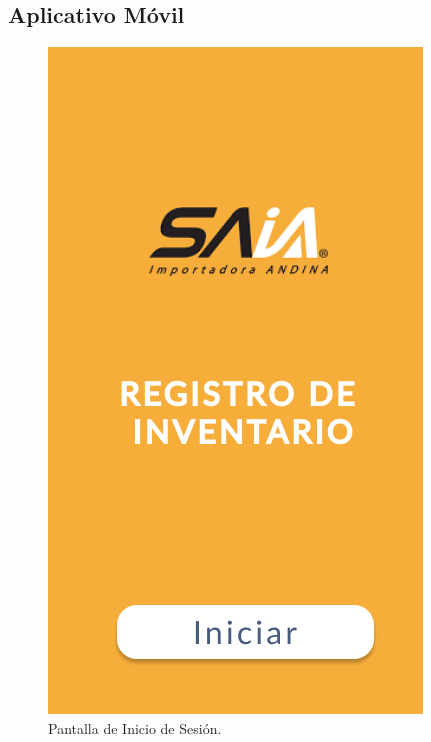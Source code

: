 \documentclass{scrreprt}
\begin{document}
    
    \subsection{Aplicativo Móvil}
    
    \begin{figure}[!htpb]
        \centerline{\includegraphics[scale=.35]{images/prototype/mobile/iPhone 8 - 1.png}}
        \caption{Pantalla de Inicio de Sesión.}
        \label{fig}
    \end{figure}
    \FloatBarrier
\end{document}
